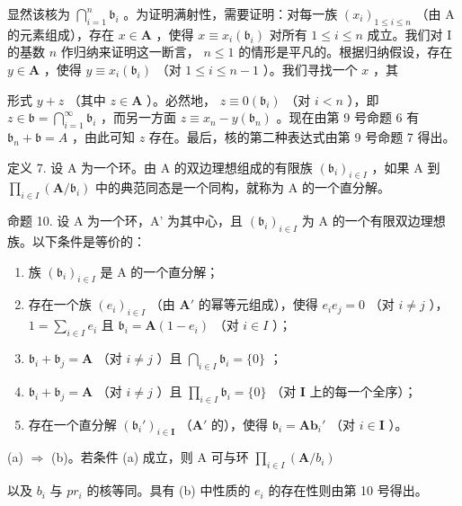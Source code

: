 显然该核为 \(\bigcap_{i=1}^{n} \mathfrak{b}_i\) 。为证明满射性，需要证明：对每一族 \((x_i)_{1 \leqslant i \leqslant n}\) （由 A 的元素组成），存在 \(x \in \mathbf{A}\) ，使得 \(x \equiv x_i (\mathfrak{b}_i)\) 对所有 \(1 \leqslant i \leqslant n\) 成立。我们对 I 的基数 \(n\) 作归纳来证明这一断言， \(n \leqslant 1\) 的情形是平凡的。根据归纳假设，存在 \(y \in \mathbf{A}\) ，使得 \(y \equiv x_i (\mathfrak{b}_i)\) （对 \(1 \leqslant i \leqslant n-1\) ）。我们寻找一个 \(x\) ，其

形式 \(y + z\) （其中 \(z \in \mathbf{A}\) ）。必然地， \(z \equiv 0(\mathfrak{b}_i)\) （对 \(i < n\) ），即 \(z \in \mathfrak{b} = \bigcap_{i=1}^{\infty} \mathfrak{b}_i\) ，而另一方面 \(z \equiv x_n - y(\mathfrak{b}_n)\) 。现在由第 9 号命题 6 有 \(\mathfrak{b}_n + \mathfrak{b} = A\) ，由此可知 \(z\) 存在。最后，核的第二种表达式由第 9 号命题 7 得出。

定义 7. 设 A 为一个环。由 A 的双边理想组成的有限族 \((\mathfrak{b}_i)_{i\in I}\) ，如果 A 到 \(\prod_{i\in I}(\mathbf{A} / \mathfrak{b}_i)\) 中的典范同态是一个同构，就称为 A 的一个直分解。

命题 10. 设 A 为一个环，A' 为其中心，且 \((\mathfrak{b}_{i})_{i\in I}\) 为 A 的一个有限双边理想族。以下条件是等价的：

\begin{enumerate}
\def\labelenumi{(\alph{enumi})}
\item
  族 \((\mathfrak{b}_i)_{i\in I}\) 是 A 的一个直分解；
\item
  存在一个族 \((e_i)_{i\in I}\) （由 \(\mathbf{A}'\) 的幂等元组成），使得 \(e_i e_j = 0\) （对 \(i\neq j\) ）， \(1 = \sum_{i\in I}e_i\) 且 \(\mathfrak{b}_i = \mathbf{A}(1 - e_i)\) （对 \(i\in I\) ）；
\item
  \(\mathfrak{b}_i + \mathfrak{b}_j = \mathbf{A}\) （对 \(i \neq j\) ）且 \(\bigcap_{i \in I} \mathfrak{b}_i = \{0\}\) ；
\item
  \(\mathfrak{b}_i + \mathfrak{b}_j = \mathbf{A}\) （对 \(i \neq j\) ）且 \(\prod_{i \in I} \mathfrak{b}_i = \{0\}\) （对 \(\mathbf{I}\) 上的每一个全序）；
\item
  存在一个直分解 \((\mathfrak{b}_i')_{i\in \mathbf{I}}\) （\(\mathbf{A}'\) 的），使得 \(\mathfrak{b}_i = \mathbf{Ab}_i'\) （对 \(i\in \mathbf{I}\) ）。
\end{enumerate}

(a) \(\Rightarrow\) (b)。若条件 (a) 成立，则 A 可与环 \(\prod_{i\in I}(\mathbf{A} / b_i)\)

以及 \(b_{i}\) 与 \(pr_{i}\) 的核等同。具有 (b) 中性质的 \(e_{i}\) 的存在性则由第 10 号得出。

